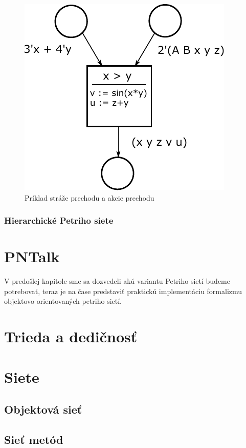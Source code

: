 \begin{figure}[H]
	\centering
	\includegraphics[scale=0.75]{obrazky-figures/PN-guard}
	\caption{Príklad stráže prechodu a akcie prechodu}
	\label{fig:guard}
\end{figure}

\subsubsection{Hierarchické Petriho siete}





\section{PNTalk}

V predošlej kapitole sme sa dozvedeli akú variantu Petriho sietí budeme potrebovať, teraz je na čase predstaviť praktickú implementáciu formalizmu objektovo orientovaných petriho sietí.
\section{Trieda a dedičnosť}

\section{Siete}

\subsection{Objektová sieť}

\subsection{Sieť metód}

